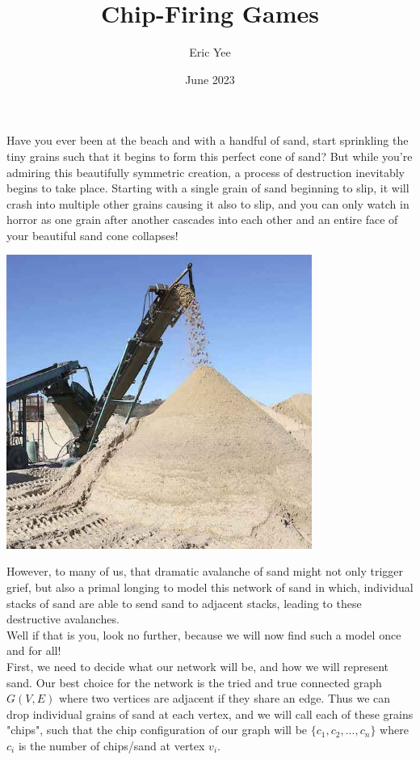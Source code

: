 \documentclass{article}
\title{Chip-Firing Games}
\author{Eric Yee}
\date{June 2023}
\begin{document}
\maketitle
Have you ever been at the beach and with a handful of sand, start sprinkling the tiny grains such that it begins to form this perfect cone of sand? But while you're admiring this beautifully symmetric creation, a process of destruction inevitably begins to take place. Starting with a single grain of sand beginning to slip, it will crash into multiple other grains causing it also to slip, and you can only watch in horror as one grain after another cascades into each other and an entire face of your beautiful sand cone collapses! \\

\begin{center}
    \includegraphics[width=10cm, scale=1.5]{images/sand.jpg}
\end{center}

However, to many of us, that dramatic avalanche of sand might not only trigger grief, but also a primal longing to model this network of sand in which, individual stacks of sand are able to send sand to adjacent stacks, leading to these destructive avalanches.\\

Well if that is you, look no further, because we will now find such a model once and for all!\\

First, we need to decide what our network will be, and how we will represent sand. Our best choice for the network is the tried and true connected graph $G(V,E)$ where two vertices are adjacent if they share an edge. Thus we can drop individual grains of sand at each vertex, and we will call each of these grains "chips", such that the chip configuration of our graph will be $\{c_1,c_2,...,c_n\}$ where $c_i$ is the number of chips/sand at vertex $v_i$.\\
\end{document}
